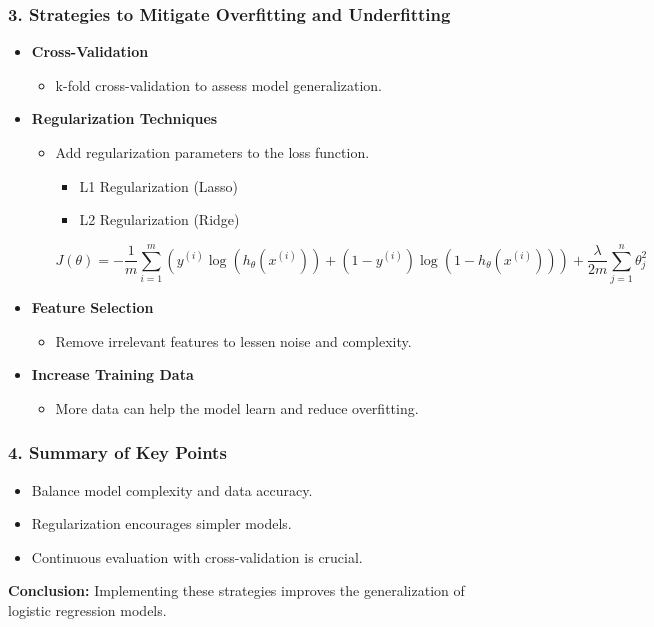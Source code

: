 \documentclass[aspectratio=169]{beamer}
\begin{document}
\begin{frame}[fragile]
    \frametitle{3. Strategies to Mitigate Overfitting and Underfitting}
    \begin{itemize}
        \item \textbf{Cross-Validation}
        \begin{itemize}
            \item k-fold cross-validation to assess model generalization.
        \end{itemize}
        
        \item \textbf{Regularization Techniques}
        \begin{itemize}
            \item Add regularization parameters to the loss function.
            \begin{itemize}
                \item L1 Regularization (Lasso)
                \item L2 Regularization (Ridge)
            \end{itemize}

            \begin{equation}
            J(\theta) = -\frac{1}{m} \sum_{i=1}^{m} \left( y^{(i)} \log(h_\theta(x^{(i)})) + (1 - y^{(i)}) \log(1 - h_\theta(x^{(i)})) \right) + \frac{\lambda}{2m} \sum_{j=1}^{n} \theta_j^2
            \end{equation}
        \end{itemize}

        \item \textbf{Feature Selection}
        \begin{itemize}
            \item Remove irrelevant features to lessen noise and complexity.
        \end{itemize}

        \item \textbf{Increase Training Data}
        \begin{itemize}
            \item More data can help the model learn and reduce overfitting.
        \end{itemize}
    \end{itemize}
\end{frame}

\begin{frame}[fragile]
    \frametitle{4. Summary of Key Points}
    \begin{itemize}
        \item Balance model complexity and data accuracy.
        \item Regularization encourages simpler models.
        \item Continuous evaluation with cross-validation is crucial.
    \end{itemize}
    \textbf{Conclusion:} Implementing these strategies improves the generalization of logistic regression models.
\end{frame}
\end{document}
